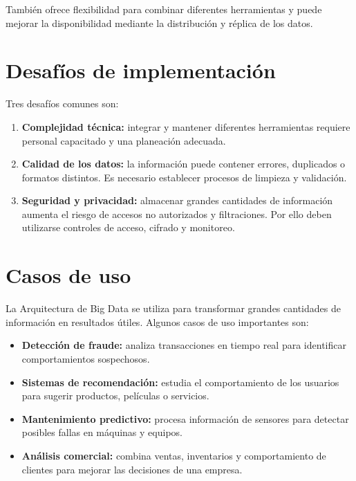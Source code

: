También ofrece flexibilidad para combinar diferentes herramientas y puede
mejorar la disponibilidad mediante la distribución y réplica de los datos.

\section{Desafíos de implementación}

Tres desafíos comunes son:

\begin{enumerate}
    \item \textbf{Complejidad técnica:} integrar y mantener diferentes
    herramientas requiere personal capacitado y una planeación adecuada.

    \item \textbf{Calidad de los datos:} la información puede contener
    errores, duplicados o formatos distintos. Es necesario establecer
    procesos de limpieza y validación.

    \item \textbf{Seguridad y privacidad:} almacenar grandes cantidades de
    información aumenta el riesgo de accesos no autorizados y filtraciones.
    Por ello deben utilizarse controles de acceso, cifrado y monitoreo.
\end{enumerate}

\section{Casos de uso}

La Arquitectura de Big Data se utiliza para transformar grandes cantidades de
información en resultados útiles. Algunos casos de uso importantes son:

\begin{itemize}
    \item \textbf{Detección de fraude:} analiza transacciones en tiempo real
    para identificar comportamientos sospechosos.

    \item \textbf{Sistemas de recomendación:} estudia el comportamiento de
    los usuarios para sugerir productos, películas o servicios.

    \item \textbf{Mantenimiento predictivo:} procesa información de sensores
    para detectar posibles fallas en máquinas y equipos.

    \item \textbf{Análisis comercial:} combina ventas, inventarios y
    comportamiento de clientes para mejorar las decisiones de una empresa.
\end{itemize}

